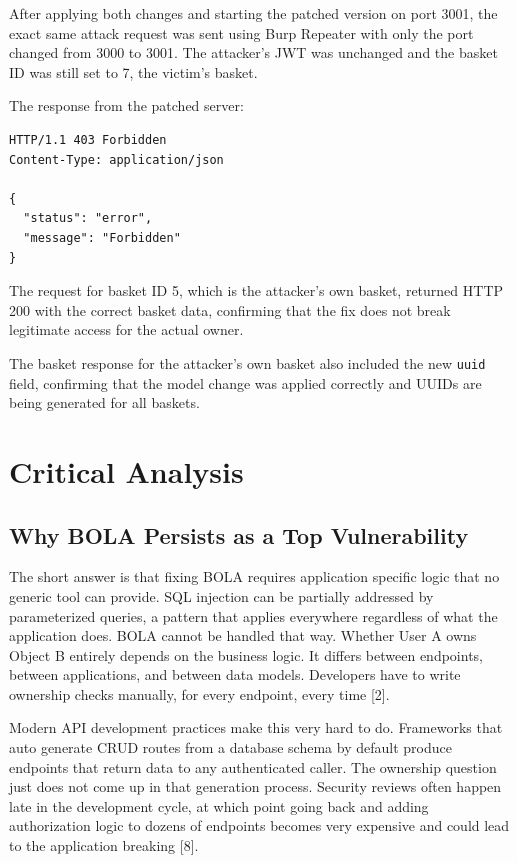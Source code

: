 \documentclass[12pt]{IEEEtran}
\begin{document}
After applying both changes and starting the patched version on port 3001, the exact same attack request was sent using Burp Repeater with only the port changed from 3000 to 3001. The attacker's JWT was unchanged and the basket ID was still set to 7, the victim's basket.

The response from the patched server:

\begin{verbatim}
HTTP/1.1 403 Forbidden
Content-Type: application/json

{
  "status": "error",
  "message": "Forbidden"
}
\end{verbatim}

The request for basket ID 5, which is the attacker's own basket, returned HTTP 200 with the correct basket data, confirming that the fix does not break legitimate access for the actual owner.

The basket response for the attacker's own basket also included the new \texttt{uuid} field, confirming that the model change was applied correctly and UUIDs are being generated for all baskets.

\section{Critical Analysis}

\subsection{Why BOLA Persists as a Top Vulnerability}

The short answer is that fixing BOLA requires application specific logic that no generic tool can provide. SQL injection can be partially addressed by parameterized queries, a pattern that applies everywhere regardless of what the application does. BOLA cannot be handled that way. Whether User A owns Object B entirely depends on the business logic. It differs between endpoints, between applications, and between data models. Developers have to write ownership checks manually, for every endpoint, every time [2].

Modern API development practices make this very hard to do. Frameworks that auto generate CRUD routes from a database schema by default produce endpoints that return data to any authenticated caller. The ownership question just does not come up in that generation process. Security reviews often happen late in the development cycle, at which point going back and adding authorization logic to dozens of endpoints becomes very expensive and could lead to the application breaking [8].
\end{document}
